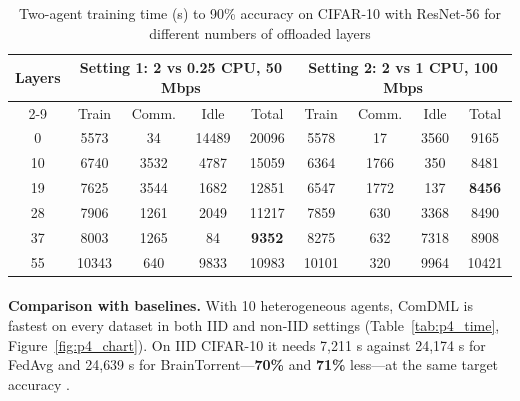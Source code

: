 \documentclass[12pt,a4paper,final]{extreport}
\begin{document}
{\renewcommand{\arraystretch}{1.12}
\begin{table}[htbp]
\centering
\caption[Two-agent training time (s) on CIFAR-10 with ResNet-56 for different numbers of offloaded layers \cite{p4}]{Two-agent training time (s) to 90\% accuracy on CIFAR-10 with ResNet-56 for different numbers of offloaded layers \cite{p4}}\label{tab:p4_layers}
\small
\begin{tabular}{|c|c|c|c|c|c|c|c|c|}
\hline
\multirow{2}{*}{\textbf{Layers}} & \multicolumn{4}{c|}{\textbf{Setting 1: 2 vs 0.25 CPU, 50 Mbps}} & \multicolumn{4}{c|}{\textbf{Setting 2: 2 vs 1 CPU, 100 Mbps}} \\ \cline{2-9}
 & Train & Comm. & Idle & Total & Train & Comm. & Idle & Total \\ \hline
0 & 5573 & 34 & 14489 & 20096 & 5578 & 17 & 3560 & 9165 \\ \hline
10 & 6740 & 3532 & 4787 & 15059 & 6364 & 1766 & 350 & 8481 \\ \hline
19 & 7625 & 3544 & 1682 & 12851 & 6547 & 1772 & 137 & \textbf{8456} \\ \hline
28 & 7906 & 1261 & 2049 & 11217 & 7859 & 630 & 3368 & 8490 \\ \hline
37 & 8003 & 1265 & 84 & \textbf{9352} & 8275 & 632 & 7318 & 8908 \\ \hline
55 & 10343 & 640 & 9833 & 10983 & 10101 & 320 & 9964 & 10421 \\ \hline
\end{tabular}
\end{table}}

\paragraph{} \textbf{Comparison with baselines.} With 10 heterogeneous agents, ComDML is fastest on every dataset in both IID and non-IID settings (Table~\ref{tab:p4_time}, Figure~\ref{fig:p4_chart}). On IID CIFAR-10 it needs 7{,}211 s against 24{,}174 s for FedAvg and 24{,}639 s for BrainTorrent---\textbf{70\%} and \textbf{71\%} less---at the same target accuracy \cite{p4}.
\end{document}
